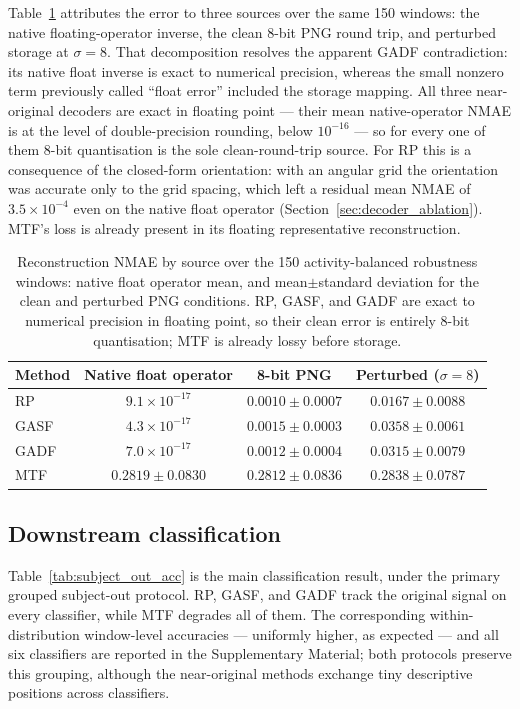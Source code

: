 \documentclass[5p]{elsarticle}
\begin{document}
Table~\ref{tab:error_sources} attributes the error to three sources over the same 150 windows: the native floating-operator inverse, the clean 8-bit PNG round trip, and perturbed storage at \(\sigma=8\). That decomposition resolves the apparent GADF contradiction: its native float inverse is exact to numerical precision, whereas the small nonzero term previously called ``float error'' included the storage mapping. All three near-original decoders are exact in floating point --- their mean native-operator NMAE is at the level of double-precision rounding, below \(10^{-16}\) --- so for every one of them 8-bit quantisation is the sole clean-round-trip source. For RP this is a consequence of the closed-form orientation: with an angular grid the orientation was accurate only to the grid spacing, which left a residual mean NMAE of \(3.5\times10^{-4}\) even on the native float operator (Section~\ref{sec:decoder_ablation}). MTF's loss is already present in its floating representative reconstruction.

\begin{table}[!htbp]
\centering
\caption{Reconstruction NMAE by source over the 150 activity-balanced robustness windows: native float operator mean, and mean$\pm$standard deviation for the clean and perturbed PNG conditions. RP, GASF, and GADF are exact to numerical precision in floating point, so their clean error is entirely 8-bit quantisation; MTF is already lossy before storage.}\label{tab:error_sources}
\begin{tabular}{lccc}
\toprule
Method & Native float operator & 8-bit PNG & Perturbed ($\sigma=8$) \\
\midrule
RP   & $9.1\times10^{-17}$ & $0.0010\pm0.0007$ & $0.0167\pm0.0088$ \\
GASF & $4.3\times10^{-17}$ & $0.0015\pm0.0003$ & $0.0358\pm0.0061$ \\
GADF & $7.0\times10^{-17}$ & $0.0012\pm0.0004$ & $0.0315\pm0.0079$ \\
MTF  & $0.2819\pm0.0830$   & $0.2812\pm0.0836$ & $0.2838\pm0.0787$ \\
\bottomrule
\end{tabular}
\end{table}

\subsection{Downstream classification}\label{sec:subject_out_results}

Table~\ref{tab:subject_out_acc} is the main classification result, under the primary grouped subject-out protocol. RP, GASF, and GADF track the original signal on every classifier, while MTF degrades all of them. The corresponding within-distribution window-level accuracies --- uniformly higher, as expected --- and all six classifiers are reported in the Supplementary Material; both protocols preserve this grouping, although the near-original methods exchange tiny descriptive positions across classifiers.
\end{document}
